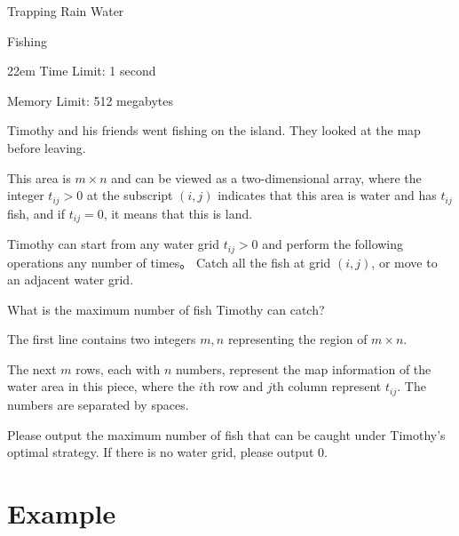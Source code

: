 \documentclass{xcpc}
\begin{document}
\begin{problem}{Trapping Rain Water}
	\end{problem}
	
	\begin{problem}{Fishing}
		\begin{boxedminipage}[c][1cm][t]{22em} 
			Time Limit: 1 second
			
			Memory Limit: 512 megabytes
		\end{boxedminipage}
		
		Timothy and his friends went fishing on the island. They looked at the map before leaving.
		
		This area is $m \times n$ and can be viewed as a two-dimensional array, where the integer $t_{ij}>0$ at the subscript $(i, j)$ indicates that this area is water and has $t_{ij}$ fish, and if $t_{ij}=0$, it means that this is land.
		
		Timothy can start from any water grid $t_{ij}>0$ and perform the following operations any number of times。 Catch all the fish at grid $(i, j)$, or move to an adjacent water grid.
		
		What is the maximum number of fish Timothy can catch?
	
	
	\begin{inputdes}
		The first line contains two integers $m,n$ representing the region of $m\times n$.
		
		The next $m$ rows, each with $n$ numbers, represent the map information of the water area in this piece, where the $i$th row and $j$th column represent $t_{ij}$. The numbers are separated by spaces.
	\end{inputdes}
	
	\begin{outputdes}
		Please output the maximum number of fish that can be caught under Timothy's optimal strategy. If there is no water grid, please output 0.
	\end{outputdes}
	
	\section*{Example}


\end{problem}
\end{document}
